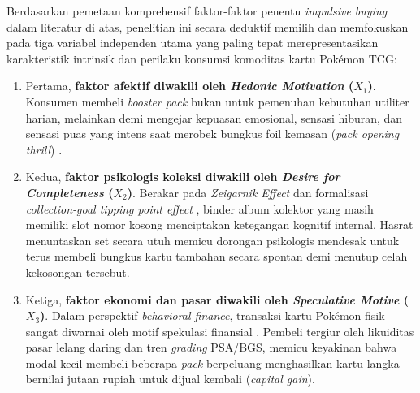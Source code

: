 \documentclass[12pt,a4paper]{article}
\numberwithin{equation}{section}
\numberwithin{table}{section}
\numberwithin{figure}{section}
\begin{document}
Berdasarkan pemetaan komprehensif faktor-faktor penentu \emph{impulsive buying} dalam literatur di atas, penelitian ini secara deduktif memilih dan memfokuskan pada tiga variabel independen utama yang paling tepat merepresentasikan karakteristik intrinsik dan perilaku konsumsi komoditas kartu Pok\'emon TCG:
\begin{enumerate}
  \item Pertama, \textbf{faktor afektif diwakili oleh \emph{Hedonic Motivation} ($X_1$)}. Konsumen membeli \emph{booster pack} bukan untuk pemenuhan kebutuhan utiliter harian, melainkan demi mengejar kepuasan emosional, sensasi hiburan, dan sensasi puas yang intens saat merobek bungkus foil kemasan (\emph{pack opening thrill}) \citep{arnold2003hedonic, gueltekin2012influence}.
  \item Kedua, \textbf{faktor psikologis koleksi diwakili oleh \emph{Desire for Completeness} ($X_2$)}. Berakar pada \emph{Zeigarnik Effect} \citep{zeigarnik1927behalten, belk1995collecting} dan formalisasi \emph{collection-goal tipping point effect} \citep{gao2014completing, barasz2017pseudo}, binder album kolektor yang masih memiliki slot nomor kosong menciptakan ketegangan kognitif internal. Hasrat menuntaskan set secara utuh memicu dorongan psikologis mendesak untuk terus membeli bungkus kartu tambahan secara spontan demi menutup celah kekosongan tersebut.
  \item Ketiga, \textbf{faktor ekonomi dan pasar diwakili oleh \emph{Speculative Motive} ($X_3$)}. Dalam perspektif \emph{behavioral finance}, transaksi kartu Pok\'emon fisik sangat diwarnai oleh motif spekulasi finansial \citep{shiller2000irrational, baur2018bitcoin, colline2024biases}. Pembeli tergiur oleh likuiditas pasar lelang daring dan tren \emph{grading} PSA/BGS, memicu keyakinan bahwa modal kecil membeli beberapa \emph{pack} berpeluang menghasilkan kartu langka bernilai jutaan rupiah untuk dijual kembali (\emph{capital gain}).
\end{enumerate}
\end{document}
